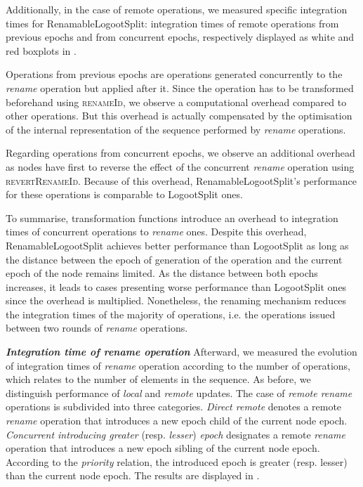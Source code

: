 \documentclass[10pt,journal,compsoc]{IEEEtran}
\newcommand{\ie}{i.e. }
\newcommand{\headerparagraph}[1]{\textbf{\emph{#1}}\quad}
\begin{document}
Additionally, in the case of remote operations, we measured specific integration times for RenamableLogootSplit: integration times of remote operations from previous epochs and from concurrent epochs, respectively displayed as white and red boxplots in .

Operations from previous epochs are operations generated concurrently to the \emph{rename} operation but applied after it.
Since the operation has to be transformed beforehand using \textsc{renameId}, we observe a computational overhead compared to other operations.
But this overhead is actually compensated by the optimisation of the internal representation of the sequence performed by \emph{rename} operations.

Regarding operations from concurrent epochs, we observe an additional overhead as nodes have first to reverse the effect of the concurrent \emph{rename} operation using \textsc{revertRenameId}.
Because of this overhead, RenamableLogootSplit's performance for these operations is comparable to LogootSplit ones.

To summarise, transformation functions introduce an overhead to integration times of concurrent operations to \emph{rename} ones.
Despite this overhead, RenamableLogootSplit achieves better performance than LogootSplit as long as the distance between the epoch of generation of the operation and the current epoch of the node remains limited.
As the distance between both epochs increases, it leads to cases presenting worse performance than LogootSplit ones since the overhead is multiplied.
Nonetheless, the renaming mechanism reduces the integration times of the majority of operations, \ie the operations issued between two rounds of \emph{rename} operations.

\headerparagraph{Integration time of \emph{rename} operation}
%
Afterward, we measured the evolution of integration times of \emph{rename} operation according to the number of operations, which relates to the number of elements in the sequence.
As before, we distinguish performance of \emph{local} and \emph{remote} updates.
The case of \emph{remote rename} operations is subdivided into three categories.
\emph{Direct remote} denotes a remote \emph{rename} operation that introduces a new epoch child of the current node epoch.
\emph{Concurrent introducing greater} (resp. \emph{lesser}) \emph{epoch} designates a remote \emph{rename} operation that introduces a new epoch sibling of the current node epoch.
According to the \emph{priority} relation, the introduced epoch is greater (resp. lesser) than the current node epoch.
The results are displayed in .
\end{document}
